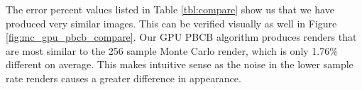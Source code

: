 The error percent values listed in Table \ref{tbl:compare} show us that we have produced very similar images. This can be verified visually as well in Figure \ref{fig:mc_gpu_pbcb_compare}. Our GPU PBCB algorithm produces renders that are most similar to the 256 sample Monte Carlo render, which is only 1.76\% different on average. This makes intuitive sense as the noise in the lower sample rate renders causes a greater difference in appearance.

\begin{figure}
   \centering
   ~
   \\

\end{figure}

